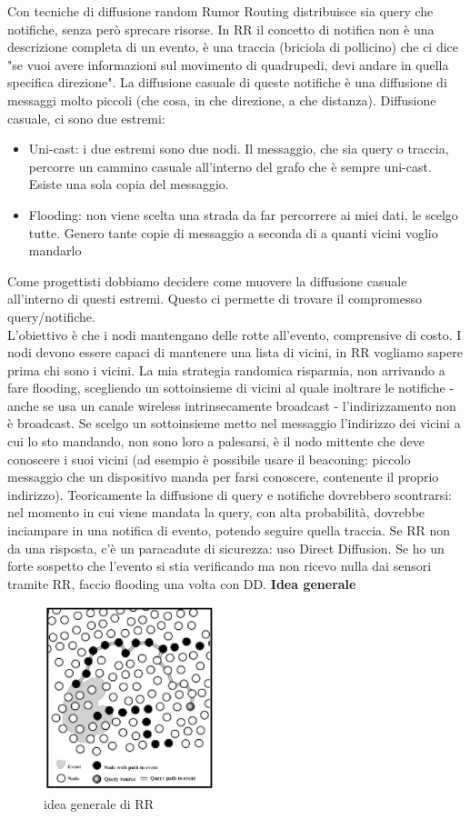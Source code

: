 \documentclass[12pt,italian]{report}
\begin{document}
Con tecniche di diffusione random Rumor Routing distribuisce sia query che notifiche, senza però sprecare risorse. In RR il concetto di notifica non è una descrizione completa di un evento, è una traccia (briciola di pollicino) che ci dice "se vuoi avere informazioni sul movimento di quadrupedi, devi andare in quella specifica direzione". La diffusione casuale di queste notifiche è una diffusione di messaggi molto piccoli (che cosa, in che direzione, a che distanza). 
\bigbreak 
Diffusione casuale, ci sono due estremi:
\begin{itemize}
    \item Uni-cast: i due estremi sono due nodi. Il messaggio, che sia query o traccia, percorre un cammino casuale all'interno del grafo che è sempre uni-cast. Esiste una sola copia del messaggio.
    \item Flooding: non viene scelta una strada da far percorrere ai miei dati, le scelgo tutte. Genero tante copie di messaggio a seconda di a quanti vicini voglio mandarlo
\end{itemize}
Come progettisti dobbiamo decidere come muovere la diffusione casuale all'interno di questi estremi. Questo ci permette di trovare il compromesso query/notifiche. \\ L'obiettivo è che i nodi mantengano delle rotte all'evento, comprensive di costo. I nodi devono essere capaci di mantenere una lista di vicini, in RR vogliamo sapere prima chi sono i vicini. La mia strategia randomica risparmia, non arrivando a fare flooding, scegliendo un sottoinsieme di vicini al quale inoltrare le notifiche - anche se usa un canale wireless intrinsecamente broadcast - l'indirizzamento non è broadcast. Se scelgo un sottoinsieme metto nel messaggio l'indirizzo dei vicini a cui lo sto mandando, non sono loro a palesarsi, è il nodo mittente che deve conoscere i suoi vicini (ad esempio è possibile usare il beaconing: piccolo messaggio che un dispositivo manda per farsi conoscere, contenente il proprio indirizzo). 
\bigbreak
Teoricamente la diffusione di query e notifiche dovrebbero scontrarsi: nel momento in cui viene mandata la query, con alta probabilità, dovrebbe inciampare in una notifica di evento, potendo seguire quella traccia. Se RR non da una risposta, c'è un paracadute di sicurezza: uso Direct Diffusion. Se ho un forte sospetto che l'evento si stia verificando ma non ricevo nulla dai sensori tramite RR, faccio flooding una volta con DD. 
\bigbreak
\noindent \textbf{Idea generale} 
\begin{figure}[h]
\centering
\includegraphics[width=50mm]{img/rumor.PNG}
\caption{idea generale di RR}
\label{fig:rr}
\end{figure}
\end{document}
